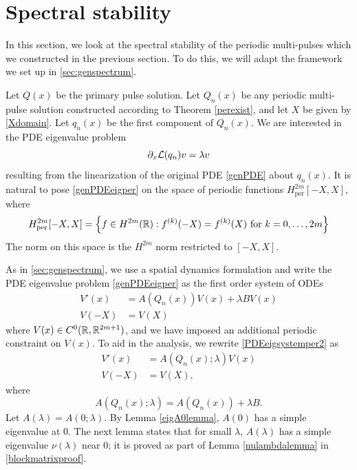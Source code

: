 \documentclass[thesis.tex]{subfiles}
\begin{document}
\section{Spectral stability}\label{sec:perstab}

In this section, we look at the spectral stability of the periodic multi-pulses which we constructed in the previous section. To do this, we will adapt the framework we set up in \cref{sec:genspectrum}.

Let $Q(x)$ be the primary pulse solution. Let $Q_n(x)$ be any periodic multi-pulse solution constructed according to Theorem \ref{perexist}, and let $X$ be given by \cref{Xdomain}. Let $q_n(x)$ be the first component of $Q_n(x)$. We are interested in the PDE eigenvalue problem
\begin{equation}\label{genPDEeigper}
\partial_x \mathcal{L}(q_n) v = \lambda v
\end{equation}
resulting from the linearization of the original PDE \cref{genPDE} about $q_n(x)$. It is natural to pose \cref{genPDEeigper} on the space of periodic functions $H^{2m}_{\text{per}}[-X,X]$, where
\[
H^{2m}_{\text{per}}[-X,X] = \left\{ f \in H^{2m}(\mathbb{R}) : f^{(k)}(-X) = f^{(k)}(X) \text{ for } k = 0, \dots, 2m \right\} 
\]
The norm on this space is the $H^{2m}$ norm restricted to $[-X, X]$. 

As in \cref{sec:genspectrum}, we use a spatial dynamics formulation and write the PDE eigenvalue problem \cref{genPDEeigper} as the first order system of ODEs
\begin{equation}\label{PDEeigsystemper2}
\begin{aligned}
V'(x) &= A(Q_n(x))V(x) + \lambda B V(x) \\
V(-X) &= V(X)
\end{aligned}
\end{equation}
where $V(x) \in C^0(\mathbb{R},\mathbb{R}^{2m+1})$, and we have imposed an additional periodic constraint on $V(x)$. To aid in the analysis, we rewrite \cref{PDEeigsystemper2} as
\begin{equation}\label{PDEeigsystemper3}
\begin{aligned}
V'(x) &= A(Q_n(x); \lambda)V(x) \\
V(-X) &= V(X),
\end{aligned}
\end{equation}
where 
\begin{equation}\label{AQnlambda}
A(Q_n(x); \lambda) = A(Q_n(x)) + \lambda B.
\end{equation}
Let $A(\lambda) = A(0; \lambda)$. By Lemma \ref{eigA0lemma}, $A(0)$ has a simple eigenvalue at 0. The next lemma states that for small $\lambda$, $A(\lambda)$ has a simple eigenvalue $\nu(\lambda)$ near 0; it is proved as part of Lemma \ref{nulambdalemma} in \cref{blockmatrixproof}.
\end{document}
